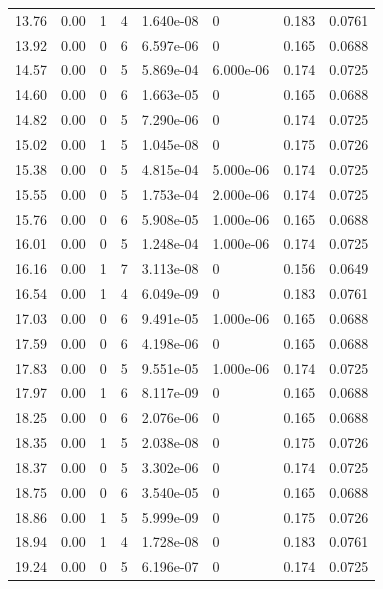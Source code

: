 \documentclass[preview]{standalone}
\begin{document}
{{{\begin{tabular}{L{1.2cm}C{1.2cm} C{0.3cm}C{0.5cm} C{1.4cm}C{1.4cm} C{1.4cm}C{1.4cm}}
  13.76  &  0.00  & 1     &  4 &  1.640e-08  & 0  & 0.183 &  0.0761   \\ 
  13.92  &  0.00  & 0     &  6 &  6.597e-06  & 0  & 0.165 &  0.0688   \\ 
  14.57  &  0.00  & 0     &  5 &  5.869e-04  & 6.000e-06  & 0.174 &  0.0725   \\ 
  14.60  &  0.00  & 0     &  6 &  1.663e-05  & 0  & 0.165 &  0.0688   \\ 
  14.82  &  0.00  & 0     &  5 &  7.290e-06  & 0  & 0.174 &  0.0725   \\ 
  15.02  &  0.00  & 1     &  5 &  1.045e-08  & 0  & 0.175 &  0.0726   \\ 
  15.38  &  0.00  & 0     &  5 &  4.815e-04  & 5.000e-06  & 0.174 &  0.0725   \\ 
  15.55  &  0.00  & 0     &  5 &  1.753e-04  & 2.000e-06  & 0.174 &  0.0725   \\ 
  15.76  &  0.00  & 0     &  6 &  5.908e-05  & 1.000e-06  & 0.165 &  0.0688   \\ 
  16.01  &  0.00  & 0     &  5 &  1.248e-04  & 1.000e-06  & 0.174 &  0.0725   \\ 
  16.16  &  0.00  & 1     &  7 &  3.113e-08  & 0  & 0.156 &  0.0649   \\ 
  16.54  &  0.00  & 1     &  4 &  6.049e-09  & 0  & 0.183 &  0.0761   \\ 
  17.03  &  0.00  & 0     &  6 &  9.491e-05  & 1.000e-06  & 0.165 &  0.0688   \\ 
  17.59  &  0.00  & 0     &  6 &  4.198e-06  & 0  & 0.165 &  0.0688   \\ 
  17.83  &  0.00  & 0     &  5 &  9.551e-05  & 1.000e-06  & 0.174 &  0.0725   \\ 
  17.97  &  0.00  & 1     &  6 &  8.117e-09  & 0  & 0.165 &  0.0688   \\ 
  18.25  &  0.00  & 0     &  6 &  2.076e-06  & 0  & 0.165 &  0.0688   \\ 
  18.35  &  0.00  & 1     &  5 &  2.038e-08  & 0  & 0.175 &  0.0726   \\ 
  18.37  &  0.00  & 0     &  5 &  3.302e-06  & 0  & 0.174 &  0.0725   \\ 
  18.75  &  0.00  & 0     &  6 &  3.540e-05  & 0  & 0.165 &  0.0688   \\ 
  18.86  &  0.00  & 1     &  5 &  5.999e-09  & 0  & 0.175 &  0.0726   \\ 
  18.94  &  0.00  & 1     &  4 &  1.728e-08  & 0  & 0.183 &  0.0761   \\ 
  19.24  &  0.00  & 0     &  5 &  6.196e-07  & 0  & 0.174 &  0.0725   \\ 

\end{tabular}}}}
\end{document}
